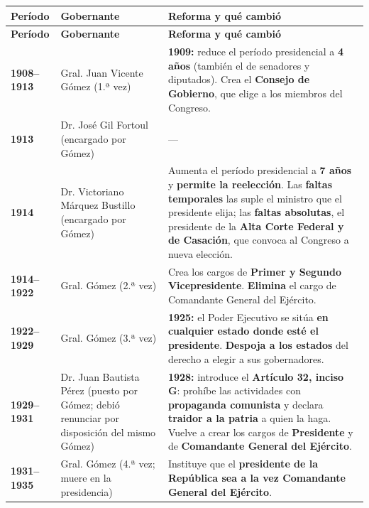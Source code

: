\documentclass[12pt, letterpaper]{article}
\begin{document}
{\small
\begin{longtable}{@{}>{\raggedright\arraybackslash}p{2.6cm}
                       >{\raggedright\arraybackslash}p{5.2cm}
                       >{\raggedright\arraybackslash}p{7.8cm}@{}}
  \toprule
  \textbf{Período} & \textbf{Gobernante} & \textbf{Reforma y qué cambió} \\
  \midrule
  \endfirsthead
  \toprule
  \textbf{Período} & \textbf{Gobernante} & \textbf{Reforma y qué cambió} \\
  \midrule
  \endhead

  \textbf{1908--1913} & Gral. Juan Vicente Gómez (1.ª vez) &
  \textbf{1909:} reduce el período presidencial a \textbf{4 años} (también el de
  senadores y diputados). Crea el \textbf{Consejo de Gobierno}, que elige a los
  miembros del Congreso. \\

  \textbf{1913} & Dr. José Gil Fortoul (encargado por Gómez) & --- \\

  \textbf{1914} & Dr. Victoriano Márquez Bustillo (encargado por Gómez) &
  Aumenta el período presidencial a \textbf{7 años} y \textbf{permite la
  reelección}. Las \textbf{faltas temporales} las suple el ministro que el
  presidente elija; las \textbf{faltas absolutas}, el presidente de la
  \textbf{Alta Corte Federal y de Casación}, que convoca al Congreso a nueva
  elección. \\

  \textbf{1914--1922} & Gral. Gómez (2.ª vez) &
  Crea los cargos de \textbf{Primer y Segundo Vicepresidente}.
  \textbf{Elimina} el cargo de Comandante General del Ejército. \\

  \textbf{1922--1929} & Gral. Gómez (3.ª vez) &
  \textbf{1925:} el Poder Ejecutivo se sitúa \textbf{en cualquier estado donde
  esté el presidente}. \textbf{Despoja a los estados} del derecho a elegir a sus
  gobernadores. \\

  \textbf{1929--1931} & Dr. Juan Bautista Pérez (puesto por Gómez; debió
  renunciar por disposición del mismo Gómez) &
  \textbf{1928:} introduce el \textbf{Artículo 32, inciso G}: prohíbe las
  actividades con \textbf{propaganda comunista} y declara \textbf{traidor a la
  patria} a quien la haga. Vuelve a crear los cargos de \textbf{Presidente} y de
  \textbf{Comandante General del Ejército}. \\

  \textbf{1931--1935} & Gral. Gómez (4.ª vez; muere en la presidencia) &
  Instituye que el \textbf{presidente de la República sea a la vez Comandante
  General del Ejército}. \\
  \bottomrule
\end{longtable}
}
\end{document}
